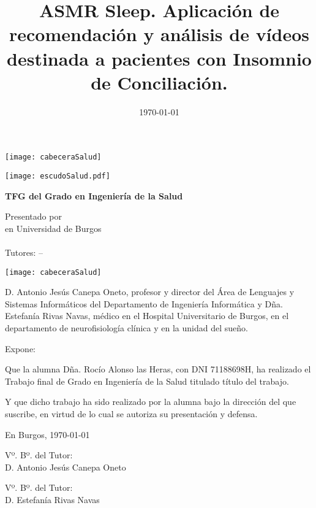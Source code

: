 \documentclass[a4paper,12pt,twoside]{memoir}
\title{ASMR Sleep. Aplicación de recomendación y análisis de vídeos destinada a pacientes con Insomnio de Conciliación.}
\author{\nombre}
\date{\today}
\makeatletter
\def\maketitle{
  \null
  \thispagestyle{empty}
\begin{center}
  \noindent\texttt{[image: cabeceraSalud]}\vspace{1.5cm}%
\end{center}
  
  \begin{center}
    \begin{minipage}[c][1.5cm][c]{.20\textwidth}
        \texttt{[image: escudoSalud.pdf]}
    \end{minipage}
  \end{center}
  
  \begin{center}
    \colorbox{cpardoBox}{%
        \begin{minipage}{.8\textwidth}
          \vspace{.5cm}\Large
          \begin{center}
          \textbf{TFG del Grado en Ingeniería de la Salud}\vspace{.6cm}\\
          \textbf{\LARGE\@title{}}
          \end{center}
          \vspace{.2cm}
        \end{minipage}
    }%
  \end{center}
  
  \begin{center}%
  {%
    \noindent\LARGE
    Presentado por \@author{}\\ 
    en Universidad de Burgos\\
    \vspace{0.5cm}
    \noindent\Large
    \@date{}\\
    \vspace{0.5cm}
    Tutores: \@tutor{} -- \@tutorb{}\\
  }%
  \end{center}%
  \null
  \cleardoublepage
  }
\newcommand{\nombre}{Rocío Alonso las Heras}
\newcommand{\nombreTutor}{Antonio Jesús Canepa Oneto}
\newcommand{\nombreTutorb}{Estefanía Rivas Navas}
\newcommand{\dni}{71188698H}
\makeatother
\begin{document}
\maketitle


\newpage\null\thispagestyle{empty}\newpage

\thispagestyle{empty}


\noindent\texttt{[image: cabeceraSalud]}\vspace{1cm}

\noindent D. \nombreTutor, profesor y director del Área de Lenguajes y Sistemas Informáticos del Departamento de Ingeniería Informática y Dña. Estefanía Rivas Navas, médico en el Hospital Universitario de Burgos, en el departamento de neurofisiología clínica y en la unidad del sueño.

\noindent Expone:

\noindent Que la alumna Dña. \nombre, con DNI \dni, ha realizado el Trabajo final de Grado en Ingeniería de la Salud titulado título del trabajo. 

\noindent Y que dicho trabajo ha sido realizado por la alumna bajo la dirección del que suscribe, en virtud de lo cual se autoriza su presentación y defensa.

\begin{center} %
En Burgos, {\large \today}
\end{center}

\vfill\vfill\vfill

\begin{minipage}{0.45\textwidth}
\begin{flushleft} %
Vº. Bº. del Tutor:\\[2cm]
D. \nombreTutor
\end{flushleft}
\end{minipage}
\hfill
\begin{minipage}{0.45\textwidth}
\begin{flushleft} %
Vº. Bº. del Tutor:\\[2cm]
D. \nombreTutorb
\end{flushleft}
\end{minipage}
\hfill

\vfill

\end{document}
